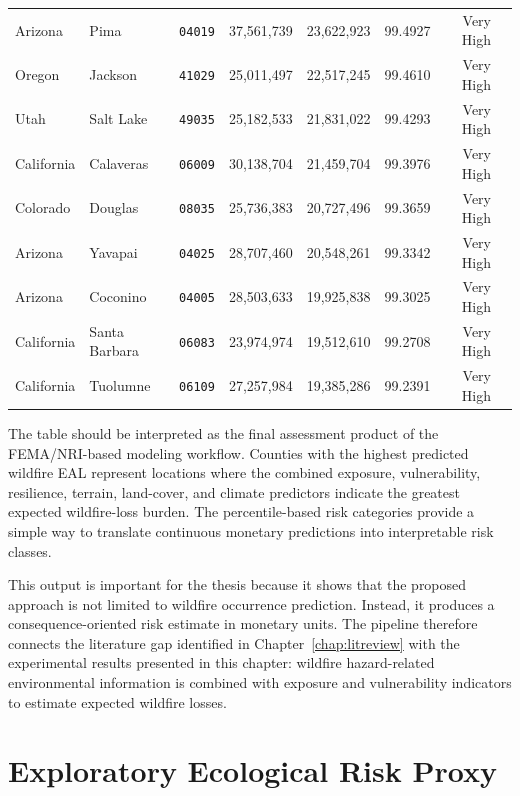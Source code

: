 \begin{table}[htbp]
{\begin{tabular}{lllrrrrl}
Arizona & Pima & \texttt{04019} & 37,561,739 & 23,622,923 & 99.4927 & Very High \\
Oregon & Jackson & \texttt{41029} & 25,011,497 & 22,517,245 & 99.4610 & Very High \\
Utah & Salt Lake & \texttt{49035} & 25,182,533 & 21,831,022 & 99.4293 & Very High \\
California & Calaveras & \texttt{06009} & 30,138,704 & 21,459,704 & 99.3976 & Very High \\
Colorado & Douglas & \texttt{08035} & 25,736,383 & 20,727,496 & 99.3659 & Very High \\
Arizona & Yavapai & \texttt{04025} & 28,707,460 & 20,548,261 & 99.3342 & Very High \\
Arizona & Coconino & \texttt{04005} & 28,503,633 & 19,925,838 & 99.3025 & Very High \\
California & Santa Barbara & \texttt{06083} & 23,974,974 & 19,512,610 & 99.2708 & Very High \\
California & Tuolumne & \texttt{06109} & 27,257,984 & 19,385,286 & 99.2391 & Very High \\
\bottomrule
\end{tabular}%
}
\end{table}

The table should be interpreted as the final assessment product of the FEMA/NRI-based modeling workflow. Counties with the highest predicted wildfire EAL represent locations where the combined exposure, vulnerability, resilience, terrain, land-cover, and climate predictors indicate the greatest expected wildfire-loss burden. The percentile-based risk categories provide a simple way to translate continuous monetary predictions into interpretable risk classes.

This output is important for the thesis because it shows that the proposed approach is not limited to wildfire occurrence prediction. Instead, it produces a consequence-oriented risk estimate in monetary units. The pipeline therefore connects the literature gap identified in Chapter~\ref{chap:litreview} with the experimental results presented in this chapter: wildfire hazard-related environmental information is combined with exposure and vulnerability indicators to estimate expected wildfire losses.

\section{Exploratory Ecological Risk Proxy}
\label{sec:ecological_proxy}

